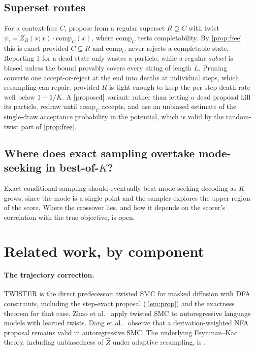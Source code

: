 \documentclass[11pt]{article}
\theoremstyle{definition}
\newcommand{\Zh}{\widehat Z}
\newcommand{\status}[1]{\textsf{\small[#1]}}
\begin{document}
\subsection{Superset routes}
For a context-free $C$, propose from a regular superset $R\supseteq C$ with twist
$\psi_t=Z_R(x;x)\cdot\mathrm{comp}_C(x)$, where $\mathrm{comp}_C$ tests completability. By \cref{prop:free} this
is exact provided $C\subseteq R$ and $\mathrm{comp}_C$ never rejects a completable state. Reporting 1 for a
dead state only wastes a particle, while a regular \emph{subset} is biased unless the bound provably covers every
string of length $L$. Pruning converts one accept-or-reject at the end into deaths at individual steps, which
resampling can repair, provided $R$ is tight enough to keep the per-step death rate well below $1-1/K$.
A \status{proposed} variant: rather than letting a dead proposal kill its particle, redraw until
$\mathrm{comp}_C$ accepts, and use an unbiased estimate of the single-draw acceptance probability in the
potential, which is valid by the random-twist part of \cref{prop:free}.

\subsection{Where does exact sampling overtake mode-seeking in best-of-$K$?}
Exact conditional sampling should eventually beat mode-seeking decoding as $K$ grows, since the mode is a single
point and the sampler explores the upper region of the score. Where the crossover lies, and how it depends on the
scorer's correlation with the true objective, is open.

\section{Related work, by component}\label{sec:related}

\paragraph{The trajectory correction.}
TWISTER \cite{twister} is the direct predecessor: twisted SMC for masked diffusion with DFA constraints,
including the step-exact proposal (\cref{lem:prop}) and the exactness theorem for that case. Zhao et al.\
\cite{zhao2024} apply twisted SMC to autoregressive language models with learned twists. Dang et al.\
\cite{dang2026icml} observe that a derivation-weighted NFA proposal remains valid in autoregressive SMC. The
underlying Feynman--Kac theory, including unbiasedness of $\Zh$ under adaptive resampling, is \cite{delmoral2004}.
\end{document}
